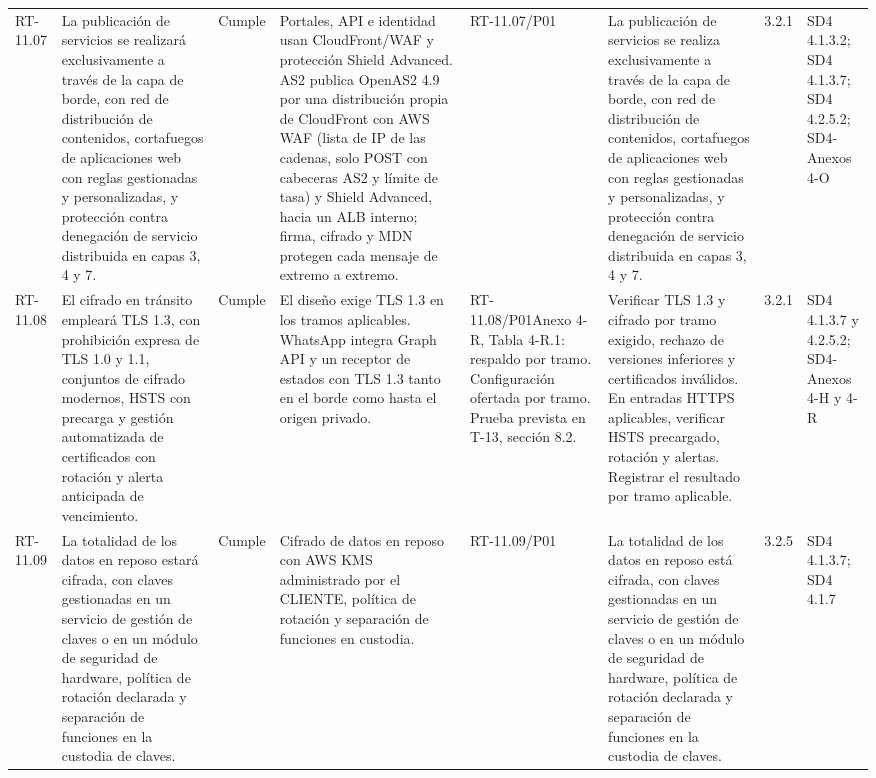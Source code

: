 \documentclass[oficio,firma,final]{lafrox}
\begin{document}
\begin{landscape}
{\begin{longtable}{@{}F{0.054} F{0.173} F{0.061} F{0.191} F{0.106} F{0.180} F{0.067} F{0.168}@{}}
  RT-11.07 & La publicación de servicios se realizará exclusivamente a través de la capa de borde, con red de distribución de contenidos, cortafuegos de aplicaciones web con reglas gestionadas y personalizadas, y protección contra denegación de servicio distribuida en capas 3, 4 y 7. & Cumple & Portales, API e identidad usan CloudFront/WAF y protección Shield Advanced. AS2 publica OpenAS2 4.9 por una distribución propia de CloudFront con AWS WAF (lista de IP de las cadenas, solo POST con cabeceras AS2 y límite de tasa) y Shield Advanced, hacia un ALB interno; firma, cifrado y MDN protegen cada mensaje de extremo a extremo. & RT-11.07/\allowbreak{}P01 & La publicación de servicios se realiza exclusivamente a través de la capa de borde, con red de distribución de contenidos, cortafuegos de aplicaciones web con reglas gestionadas y personalizadas, y protección contra denegación de servicio distribuida en capas 3, 4 y 7. & 3.2.1 & SD4 4.1.3.2; SD4 4.1.3.7; SD4 4.2.5.2; SD4-Anexos 4-O  \\
  RT-11.08 & El cifrado en tránsito empleará TLS 1.3, con prohibición expresa de TLS 1.0 y 1.1, conjuntos de cifrado modernos, HSTS con precarga y gestión automatizada de certificados con rotación y alerta anticipada de vencimiento. & Cumple & El diseño exige TLS 1.3 en los tramos aplicables. WhatsApp integra Graph API y un receptor de estados con TLS 1.3 tanto en el borde como hasta el origen privado. & RT-11.08/\allowbreak{}P01\newline Anexo 4-R, Tabla 4-R.1: respaldo por tramo. Configuración ofertada por tramo. Prueba prevista en T-13, sección 8.2. & Verificar TLS 1.3 y cifrado por tramo exigido, rechazo de versiones inferiores y certificados inválidos. En entradas HTTPS aplicables, verificar HSTS precargado, rotación y alertas. Registrar el resultado por tramo aplicable. & 3.2.1 & SD4 4.1.3.7 y 4.2.5.2; SD4-Anexos 4-H y 4-R  \\
  RT-11.09 & La totalidad de los datos en reposo estará cifrada, con claves gestionadas en un servicio de gestión de claves o en un módulo de seguridad de hardware, política de rotación declarada y separación de funciones en la custodia de claves. & Cumple & Cifrado de datos en reposo con AWS KMS administrado por el CLIENTE, política de rotación y separación de funciones en custodia. & RT-11.09/\allowbreak{}P01 & La totalidad de los datos en reposo está cifrada, con claves gestionadas en un servicio de gestión de claves o en un módulo de seguridad de hardware, política de rotación declarada y separación de funciones en la custodia de claves. & 3.2.5 & SD4 4.1.3.7; SD4 4.1.7  \\

\end{longtable}}
\end{landscape}
\end{document}

